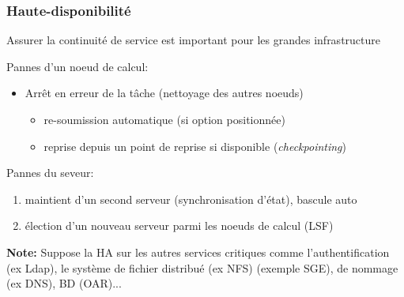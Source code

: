 \documentclass{beamer}
\begin{document}
\begin{frame}
	\frametitle{Haute-disponibilité}
	Assurer la continuité de service est important pour les grandes infrastructure

	\begin{block}{Pannes d'un noeud de calcul:}
	\begin{itemize}
	  \item Arrêt en erreur de la tâche  (nettoyage des autres noeuds)
		\begin{itemize}
  		\item re-soumission automatique (si option positionnée)
			\item reprise depuis un point de reprise si disponible ({\em checkpointing})
		\end{itemize}
	\end{itemize}
  \end{block}

  \begin{block}{Pannes du seveur:}

	  \begin{enumerate}
  	  \item maintient d'un second serveur (synchronisation d'état), bascule auto
 		  \item élection d'un nouveau serveur parmi les noeuds de calcul (LSF)
	  \end{enumerate}
  \end{block}

{\bf Note:} Suppose la HA sur les autres services critiques comme l'authentification (ex Ldap), le système de fichier distribué (ex NFS) (exemple SGE), de nommage (ex DNS), BD (OAR)...

\end{frame}
\end{document}
